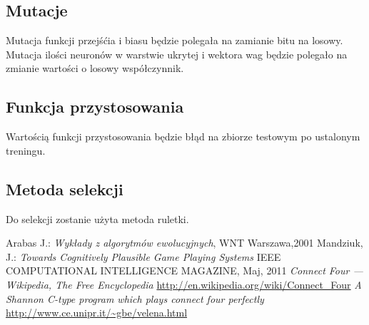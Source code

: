 \documentclass{llncs}
\begin{document}
\subsection{Mutacje}
Mutacja funkcji przejśćia i biasu będzie polegała na zamianie bitu na losowy.
Mutacja ilości neuronów w warstwie ukrytej i wektora wag będzie polegało na zmianie
wartości o losowy współczynnik.

\subsection{Funkcja przystosowania}
Wartością funkcji przystosowania będzie błąd na zbiorze testowym po ustalonym treningu.

\subsection{Metoda selekcji}
Do selekcji zostanie użyta metoda ruletki.

%
%
\begin{thebibliography}{4}
%
Arabas J.:
\textsl{Wykłady z algorytmów ewolucyjnych}, WNT Warszawa,2001
Mandziuk, J.:
\textsl{Towards Cognitively Plausible Game Playing Systems}
IEEE COMPUTATIONAL INTELLIGENCE MAGAZINE, Maj, 2011
\textsl{Connect Four --- {W}ikipedia{,} The Free Encyclopedia}
\url{http://en.wikipedia.org/wiki/Connect_Four}
\textsl{A Shannon C-type program which plays connect four perfectly}
\url{http://www.ce.unipr.it/~gbe/velena.html}
\end{thebibliography}
\end{document}
